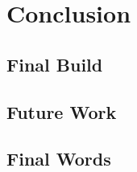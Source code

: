 \documentclass{article}
\begin{document}
\section{Conclusion}

\subsection{Final Build}

\subsection{Future Work}

\subsection{Final Words}


\clearpage



\end{document}
